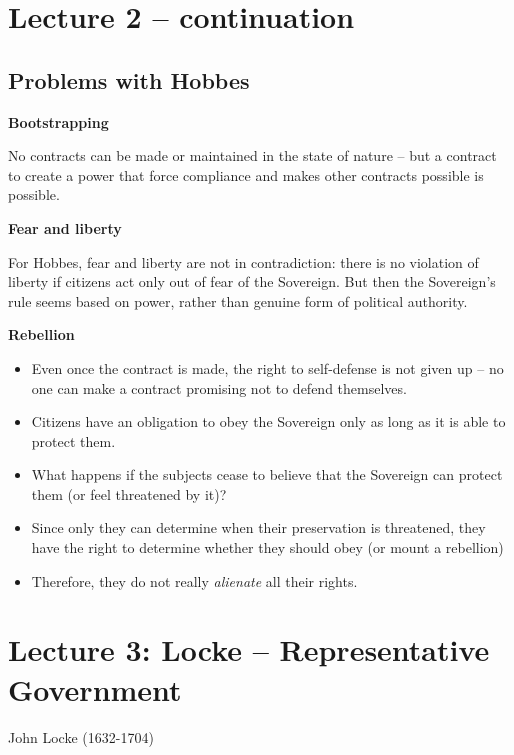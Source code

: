\section{Lecture 2 -- continuation}

\subsection{Problems with Hobbes}

\textbf{Bootstrapping}

No contracts can be made or maintained in the state of nature -- but a contract
to create a power that force compliance and makes other contracts possible
is possible.

\textbf{Fear and liberty}

For Hobbes, fear and liberty are not in contradiction: there is no violation of
liberty if citizens act only out of fear of the Sovereign. But then the
Sovereign's rule seems based on power, rather than genuine form of political
authority.

\textbf{Rebellion}

\begin{itemize}
    \item Even once the contract is made, the right to self-defense is not given
    up -- no one can make a contract promising not to defend themselves.
    \item Citizens have an obligation to obey the Sovereign only as long as it
    is able to protect them.
    \item What happens if the subjects cease to believe that the Sovereign can
    protect them (or feel threatened by it)?
    \item Since only they can determine when their preservation is threatened,
    they have the right to determine whether they should obey (or mount a
    rebellion)
    \item Therefore, they do not really \textit{alienate} all their rights.
\end{itemize}


\section{Lecture 3: Locke -- Representative Government}

John Locke (1632-1704)

